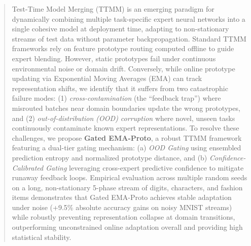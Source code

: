 \documentclass{article}
\theoremstyle{plain}
\theoremstyle{definition}
\theoremstyle{remark}
\begin{document}

\printAffiliationsAndNotice{}

\begin{abstract}
Test-Time Model Merging (TTMM) is an emerging paradigm for dynamically combining multiple task-specific expert neural networks into a single cohesive model at deployment time, adapting to non-stationary streams of test data without parameter backpropagation. Standard TTMM frameworks rely on feature prototype routing computed offline to guide expert blending. However, static prototypes fail under continuous environmental noise or domain drift. Conversely, while online prototype updating via Exponential Moving Averages (EMA) can track representation shifts, we identify that it suffers from two catastrophic failure modes: (1) \textit{cross-contamination} (the ``feedback trap'') where misrouted batches near domain boundaries update the wrong prototypes, and (2) \textit{out-of-distribution (OOD) corruption} where novel, unseen tasks continuously contaminate known expert representations. To resolve these challenges, we propose \textbf{Gated EMA-Proto}, a robust TTMM framework featuring a dual-tier gating mechanism: (a) \textit{OOD Gating} using ensembled prediction entropy and normalized prototype distance, and (b) \textit{Confidence-Calibrated Gating} leveraging cross-expert predictive confidence to mitigate runaway feedback loops. Empirical evaluation across multiple random seeds on a long, non-stationary 5-phase stream of digits, characters, and fashion items demonstrates that Gated EMA-Proto achieves stable adaptation under noise (+9.5\% absolute accuracy gains on noisy MNIST streams) while robustly preventing representation collapse at domain transitions, outperforming unconstrained online adaptation overall and providing high statistical stability.
\end{abstract}
\end{document}
